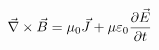 \documentclass[preview]{standalone}
\begin{document}
\begin{align*}
\special{dvisvgm:raw <g id='unique000'>}\vec{\nabla} \times \vec{B} = \mu_0 \vec{J} + \mu \varepsilon_0 \frac{\partial \vec{E}}{\partial t}\special{dvisvgm:raw </g>}
\end{align*}
\end{document}
